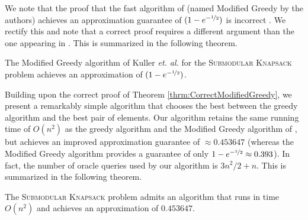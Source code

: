 \documentclass[a4paper,UKenglish,cleveref, autoref]{lipics-v2019}
\newcommand{\SK}{{\textsc{Submodular Knapsack}}\xspace}
\begin{document}
 We note that the proof that the fast algorithm of \cite{khuller1999budgeted} (named Modified Greedy by the authors) achieves an approximation guarantee of $(1-e^{-\nicefrac[]{1}{2}})$ is incorrect \cite{naor}.
We rectify this and note that a correct proof requires a different argument than the one appearing in \cite{khuller1999budgeted}.
This is summarized in the following theorem.
\begin{theorem}\label{thrm:CorrectModifiedGreedy}
The Modified Greedy algorithm of Kuller {\em et. al.} \cite{khuller1999budgeted} for the \SK problem achieves an approximation of $(1-e^{-\nicefrac[]{1}{2}})$.
\end{theorem}
Building upon the correct proof of Theorem \ref{thrm:CorrectModifiedGreedy}, we present a remarkably simple algorithm that chooses the best between the greedy algorithm and the best pair of elements.
Our algorithm retains the same running time of $O(n^2)$ as the greedy algorithm and the Modified Greedy algorithm of \cite{khuller1999budgeted}, but achieves an improved approximation guarantee of $\approx 0.453647$ (whereas the Modified Greedy algorithm provides a guarantee of only $1-e^{-\nicefrac{1}{2}}\approx 0.393$).
In fact, the number of oracle queries used by our algorithm is $3n^2/2+n$.
This is summarized in the following theorem.
\begin{theorem}\label{thrm:ModifiedSquared}
The \SK problem admits an algorithm that runs in time $O(n^2)$ and achieves an approximation of $0.453647$.
\end{theorem}
\end{document}
